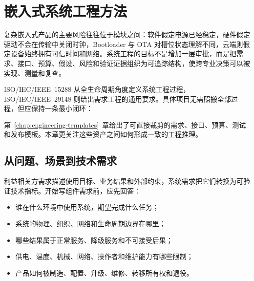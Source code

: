 \chapter{嵌入式系统工程方法}
\label{chap:system-engineering-method}

复杂嵌入式产品的主要风险往往位于模块之间：软件假定电源已经稳定，硬件假定驱动不会在传输中关闭时钟，Bootloader 与 OTA 对槽位状态理解不同，云端则假定设备始终拥有可信时间和网络。系统工程的目标不是增加一层审批，而是把需求、接口、预算、假设、风险和验证证据组织为可追踪结构，使跨专业决策可以被实现、测量和复查。

ISO/IEC/IEEE~15288 从全生命周期角度定义系统工程过程，ISO/IEC/IEEE~29148 则给出需求工程的通用要求\cite{iso-iec-ieee-15288,iso-iec-ieee-29148}。具体项目无需照搬全部过程，但应保持一条最小闭环：

\begin{center}
\end{center}

第~\ref{chap:engineering-templates}~章给出了可直接裁剪的需求、接口、预算、测试和发布模板。本章更关注这些资产之间如何形成一致的工程推理。

\section{从问题、场景到技术需求}

利益相关方需求描述使用目标、业务结果和外部约束，系统需求把它们转换为可验证技术指标。开始写组件需求前，应先回答：

\begin{itemize}
  \item 谁在什么环境中使用系统，期望完成什么任务；
  \item 系统的物理、组织、网络和生命周期边界在哪里；
  \item 哪些结果属于正常服务、降级服务和不可接受后果；
  \item 供电、温度、机械、网络、操作者和维护能力有哪些限制；
  \item 产品如何被制造、配置、升级、维修、转移所有权和退役。
\end{itemize}

